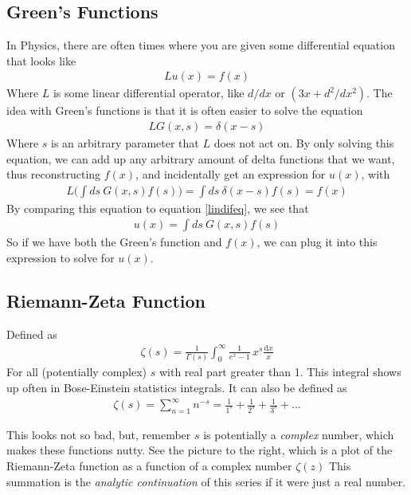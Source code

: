 \subsection{Green's Functions}\label{green}
In Physics, there are often times where you are given some differential equation that looks like
\begin{align}\label{lindifeq}
L u(x) = f(x)
\end{align}
Where $L$ is some linear differential operator, like $d/dx$ or $(3x+d^2/dx^2)$. The idea with Green's functions is that it is often easier to solve the equation
\begin{align}
L G(x,s) = \delta(x-s)
\end{align}
Where $s$ is an arbitrary parameter that $L$ does not act on. By only solving this equation, we can add up any arbitrary amount of delta functions that we want, thus reconstructing $f(x)$, and incidentally get an expression for $u(x)$, with
\begin{align}
L\Big(\int ds~G(x,s)f(s)\Big) = \int ds~\delta(x-s) f(s) = f(x)
\end{align}
By comparing this equation to equation \ref{lindifeq}, we see that
\begin{align}
u(x) = \int ds~G(x,s)f(s)
\end{align}
So if we have both the Green's function and $f(x)$, we can plug it into this expression to solve for $u(x)$. %



\subsection{Riemann-Zeta Function}

Defined as
\begin{align}
	\zeta(s) = \frac{1}{\Gamma(s)} \int_{0}^{\infty} \frac{1}{e ^ x - 1}\,x ^ s \frac{\mathrm{d}x}{x} 
\end{align}
For all (potentially complex) $s$ with real part greater than 1. This integral shows up often in Bose-Einstein statistics integrals. It can also be defined as 
\begin{align}
	\zeta(s) = \sum_{n=1}^\infty n^{-s} = \frac{1}{1^s} + \frac{1}{2^s} + \frac{1}{3^s} + ...
\end{align}

\begin{multicols}{2}
	This looks not so bad, but, remember $s$ is potentially a \emph{complex} number, which makes these functions nutty. See the picture to the right, which is a plot of the Riemann-Zeta function as a function of a complex number $\zeta(z)$ This summation is the \emph{analytic continuation} of this series if it were just a real number. 
\columnbreak





\end{multicols}




